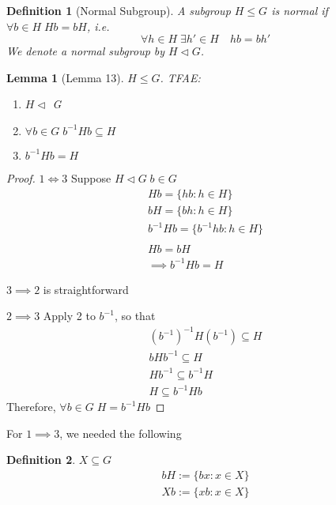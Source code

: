 \documentclass[11pt, oneside]{book}
\theoremstyle{break}
\newtheorem*{proof}{Proof}
\newtheorem{lemma}{Lemma}[section]
\newtheorem{defn}{Definition}[section]
\begin{document}
\begin{defn}[Normal Subgroup]
    A subgroup $H \leq G$ is normal if $\forall b \in H \; Hb = bH$, i.e.
    \begin{equation}
        \forall h \in H \; \exists h' \in H \quad hb = bh'
    \end{equation}
    We denote a normal subgroup by $H \triangleleft G$.
\end{defn}

\begin{lemma}[Lemma 13]\label{lemma:13}
    $H \leq G$. TFAE:
    \begin{enumerate}
        \item $H \triangleleft$ G
        \item $\forall b \in G \; b^{-1}Hb \subseteq H$
        \item $b^{-1}Hb = H$
    \end{enumerate}
\end{lemma}

\begin{proof}
    $1 \iff 3$ Suppose $H \triangleleft G \; b \in G$
    \begin{gather*}
        Hb = \{hb : h \in H\} \\
        bH = \{bh : h \in H\} \\
        b^{-1}Hb = \{b^{-1}hb : h \in H\} \\
        \\
        Hb = bH \\
        \implies b^{-1}Hb = H
    \end{gather*}

    $3 \implies 2$ is straightforward

    $2 \implies 3$ Apply 2 to $b^{-1}$, so that
    \begin{gather*}
        (b^{-1})^{-1} H (b^{-1}) \subseteq H \\
        bHb^{-1} \subseteq H \\
        Hb^{-1} \subseteq b^{-1}H \\
        H \subseteq b^{-1}Hb
    \end{gather*}
    Therefore, $\forall b \in G \; H = b^{-1}Hb$
\end{proof}

For $1 \implies 3$, we needed the following

\begin{defn}
    $X \subseteq G$
    \begin{gather*}
        bH := \{bx : x \in X\} \\
        Xb := \{xb : x \in X\}
    \end{gather*}
\end{defn}
\end{document}
